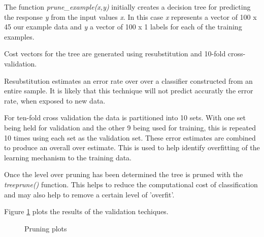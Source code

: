 The function \emph{prune\_example(x,y)} initially creates a decision tree for predicting the response \emph{y} from the input
values \emph{x}. In this case \emph{x} represents a vector of 100 x 45 our
example data and \emph{y} a vector of 100 x 1 labels for each of the training
examples.

Cost vectors for the tree are generated using resubstitution and 10-fold
cross-validation.

Resubstitution estimates an error rate over over a classifier constructed from
an entire sample. It is likely that this technique will not predict accuratly
the error rate, when exposed to new data.

For ten-fold cross validation the data is partitioned into 10 sets. With one
set being held for validation and the other 9 being used for training, this is
repeated 10 times using each set as the validation set. These error estimates are
combined to produce an overall over estimate. This is used to help identify
overfitting of the learning mechanism to the training data.

Once the level over pruning has been determined the tree is pruned with the
\emph{treeprune()} function. This helps to reduce the computational cost of
classification and may also help to remove a certain level of 'overfit'.

Figure \ref{fig:pruning} plots the results of the validation techiques.

\begin{figure}[h]
    \centering
    \caption{Pruning plots}
    \label{fig:pruning}
\end{figure}
